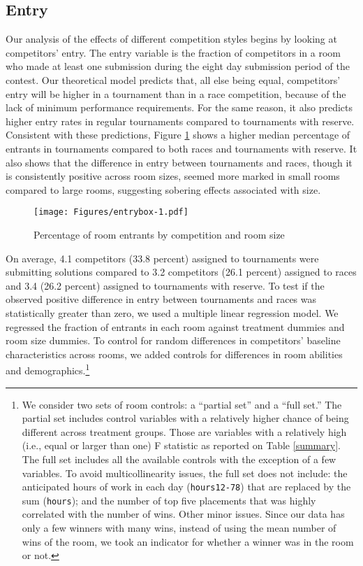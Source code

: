 \documentclass[10pt, titlepage]{article}
\begin{document}
\subsection{Entry}\label{entry}

Our analysis of the effects of different competition styles begins by
looking at competitors' entry. The entry variable is the fraction of
competitors in a room who made at least one submission during the eight
day submission period of the contest. Our theoretical model predicts
that, all else being equal, competitors' entry will be higher in a
tournament than in a race competition, because of the lack of minimum
performance requirements. For the same reason, it also predicts higher
entry rates in regular tournaments compared to tournaments with reserve.
Consistent with these predictions, Figure \ref{room entrants} shows a
higher median percentage of entrants in tournaments compared to both
races and tournaments with reserve. It also shows that the difference in
entry between tournaments and races, though it is consistently positive
across room sizes, seemed more marked in small rooms compared to large
rooms, suggesting sobering effects associated with size.

\begin{figure}
\caption{Percentage of room entrants by competition and room size}
\label{room entrants}
\texttt{[image: Figures/entrybox-1.pdf]}
\end{figure}

On average, 4.1 competitors (33.8 percent) assigned to tournaments were
submitting solutions compared to 3.2 competitors (26.1 percent) assigned
to races and 3.4 (26.2 percent) assigned to tournaments with reserve. To
test if the observed positive difference in entry between tournaments
and races was statistically greater than zero, we used a multiple linear
regression model. We regressed the fraction of entrants in each room
against treatment dummies and room size dummies. To control for random
differences in competitors' baseline characteristics across rooms, we
added controls for differences in room abilities and
demographics.\footnote{We consider two sets of room controls: a
  ``partial set'' and a ``full set.'' The partial set includes control
  variables with a relatively higher chance of being different across
  treatment groups. Those are variables with a relatively high (i.e.,
  equal or larger than one) F statistic as reported on Table
  \ref{summary}. The full set includes all the available controls with
  the exception of a few variables. To avoid multicollinearity issues,
  the full set does not include: the anticipated hours of work in each
  day (\texttt{hours12-78}) that are replaced by the sum
  (\texttt{hours}); and the number of top five placements that was
  highly correlated with the number of wins. Other minor issues. Since
  our data has only a few winners with many wins, instead of using the
  mean number of wins of the room, we took an indicator for whether a
  winner was in the room or not.}
\end{document}
